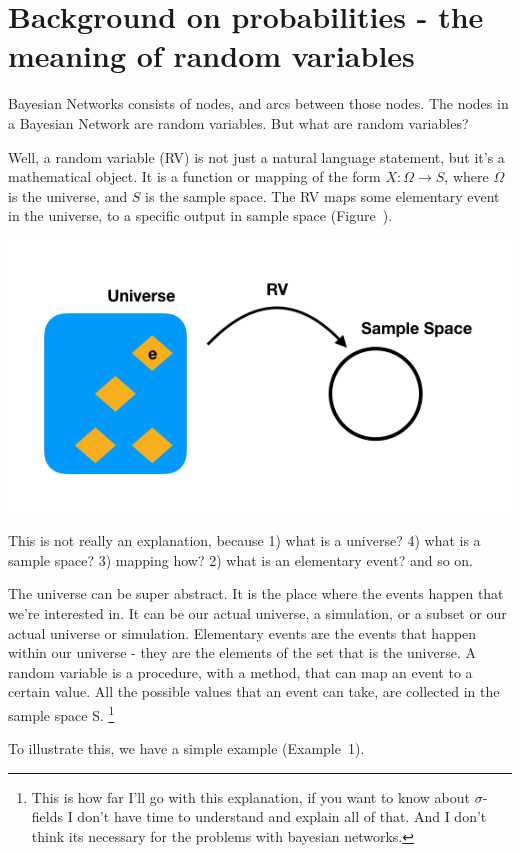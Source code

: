 \section{Background on probabilities - the meaning of random variables}

Bayesian Networks consists of nodes, and arcs between those nodes. The nodes in a Bayesian Network are random variables. But what are random variables? 

Well, a random variable (RV) is not just a natural language statement, but it's a mathematical object. It is a function or mapping of the form $X : \Omega \rightarrow S$, where $\Omega$ is the universe, and $S$ is the sample space. The RV maps some elementary event in the universe, to a specific output in sample space (Figure~).


\includegraphics[width=\linewidth]{images/rv1.png}


This is not really an explanation, because 1) what is a universe? 4) what is a sample space? 3) mapping how? 2) what is an elementary event? and so on.

The universe can be super abstract. It is the place where the events happen that we're interested in. It can be our actual universe, a simulation, or a subset or our actual universe or simulation. Elementary events are the events that happen within our universe - they are the elements of the set that is the universe. A random variable is a procedure, with a method, that can map an event to a certain value. All the possible values that an event can take, are collected in the sample space S. \footnote{This is how far I'll go with this explanation, if you want to know about $\sigma$-fields I don't have time to understand and explain all of that. And I don't think its necessary for the problems with bayesian networks.}

To illustrate this, we have a simple example (Example~1).


